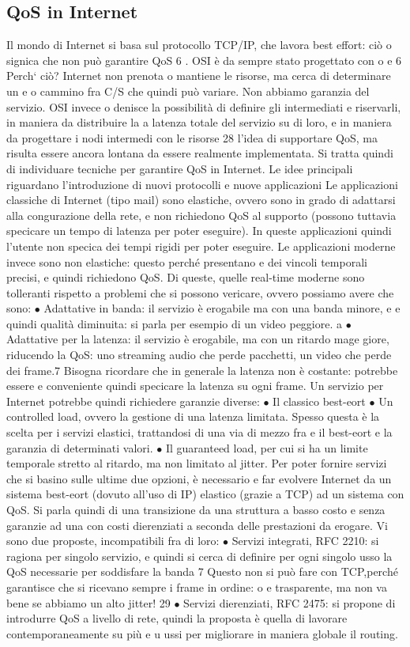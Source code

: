 \documentclass[a4paper,12pt]{article}
\begin{document}
\subsection{QoS in Internet}
Il mondo di Internet si basa sul protocollo TCP/IP, che lavora best effort: ciò
o
signica che non può garantire QoS 6 . OSI è da sempre stato progettato con
o
e
6 Perch` ciò? Internet non prenota o mantiene le risorse, ma cerca di determinare un
e o
cammino fra C/S che quindi può variare. Non abbiamo garanzia del servizio. OSI invece
o
denisce la possibilità di definire gli intermediati e riservarli, in maniera da distribuire la
a
latenza totale del servizio su di loro, e in maniera da progettare i nodi intermedi con le risorse
28
l'idea di supportare QoS, ma risulta essere ancora lontana da essere realmente
implementata. Si tratta quindi di individuare tecniche per garantire QoS in Internet. Le idee principali riguardano
l'introduzione di nuovi protocolli e nuove
applicazioni
Le applicazioni classiche di Internet (tipo mail) sono elastiche, ovvero sono
in grado di adattarsi alla congurazione della rete, e non richiedono QoS al
supporto (possono tuttavia specicare un tempo di latenza per poter eseguire).
In queste applicazioni quindi l'utente non specica dei tempi rigidi per poter
eseguire.
Le applicazioni moderne invece sono non elastiche: questo perché presentano
e
dei vincoli temporali precisi, e quindi richiedono QoS. Di queste, quelle real-time
moderne sono tolleranti rispetto a problemi che si possono vericare, ovvero
possiamo avere che sono:
$\bullet$ Adattative in banda: il servizio è erogabile ma con una banda minore, e
e
quindi qualità diminuita: si parla per esempio di un video peggiore.
a
$\bullet$ Adattative per la latenza: il servizio è erogabile, ma con un ritardo mage
giore, riducendo la QoS: uno streaming audio che perde pacchetti, un video
che perde dei frame.7
Bisogna ricordare che in generale la latenza non è costante: potrebbe essere
e
conveniente quindi specicare la latenza su ogni frame.
Un servizio per Internet potrebbe quindi richiedere garanzie diverse:
$\bullet$ Il classico best-eort
$\bullet$ Un controlled load, ovvero la gestione di una latenza limitata. Spesso
questa è la scelta per i servizi elastici, trattandosi di una via di mezzo fra
e
il best-eort e la garanzia di determinati valori.
$\bullet$ Il guaranteed load, per cui si ha un limite temporale stretto al ritardo, ma
non limitato al jitter.
Per poter fornire servizi che si basino sulle ultime due opzioni, è necessario
e
far evolvere Internet da un sistema best-eort (dovuto all'uso di IP) elastico
(grazie a TCP) ad un sistema con QoS. Si parla quindi di una transizione da
una struttura a basso costo e senza garanzie ad una con costi dierenziati a
seconda delle prestazioni da erogare. Vi sono due proposte, incompatibili fra di
loro:
$\bullet$ Servizi integrati, RFC 2210: si ragiona per singolo servizio, e quindi si
cerca di definire per ogni singolo usso la QoS
necessarie per soddisfare la banda
7 Questo non si può fare con TCP,perché garantisce che si ricevano sempre i frame in ordine:
o
e
trasparente, ma non va bene se abbiamo un alto jitter!
29
$\bullet$ Servizi dierenziati, RFC 2475: si propone di introdurre QoS a livello di
rete, quindi la proposta è quella di lavorare contemporaneamente su più
e
u
ussi per migliorare in maniera globale il routing.
\end{document}
